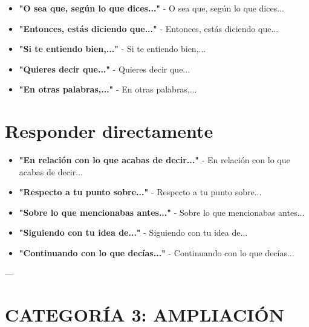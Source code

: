 \documentclass[a4paper,11pt]{article}
\begin{document}
\begin{itemize}

  \item \textbf{"O sea que, según lo que dices..."} - O sea que, según lo que dices...

  \item \textbf{"Entonces, estás diciendo que..."} - Entonces, estás diciendo que...

  \item \textbf{"Si te entiendo bien,..."} - Si te entiendo bien,...

  \item \textbf{"Quieres decir que..."} - Quieres decir que...

  \item \textbf{"En otras palabras,..."} - En otras palabras,...

\end{itemize}

\vspace{0.2cm}

\section{Responder directamente}

\begin{itemize}

  \item \textbf{"En relación con lo que acabas de decir..."} - En relación con lo que acabas de decir...

  \item \textbf{"Respecto a tu punto sobre..."} - Respecto a tu punto sobre...

  \item \textbf{"Sobre lo que mencionabas antes..."} - Sobre lo que mencionabas antes...

  \item \textbf{"Siguiendo con tu idea de..."} - Siguiendo con tu idea de...

  \item \textbf{"Continuando con lo que decías..."} - Continuando con lo que decías...

\end{itemize}

\vspace{0.2cm}

---

\vspace{0.2cm}

\section{CATEGORÍA 3: AMPLIACIÓN}
\end{document}
